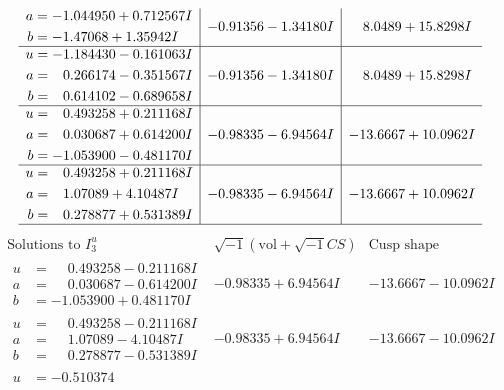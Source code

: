 \documentclass[1p]{elsarticle_modified}
\theoremstyle{definition}
\newcommand{\I}{\sqrt{-1}}
\begin{document}
$$\begin{array}{c|c|c}
\begin{aligned}
a &= -1.044950 + 0.712567 I \\
b &= -1.47068 + 1.35942 I\end{aligned}
 & -0.91356 - 1.34180 I & \phantom{-}8.0489 + 15.8298 I \\ \hline\begin{aligned}
u &= -1.184430 - 0.161063 I \\
a &= \phantom{-}0.266174 - 0.351567 I \\
b &= \phantom{-}0.614102 - 0.689658 I\end{aligned}
 & -0.91356 - 1.34180 I & \phantom{-}8.0489 + 15.8298 I \\ \hline\begin{aligned}
u &= \phantom{-}0.493258 + 0.211168 I \\
a &= \phantom{-}0.030687 + 0.614200 I \\
b &= -1.053900 - 0.481170 I\end{aligned}
 & -0.98335 - 6.94564 I & -13.6667 + 10.0962 I \\ \hline\begin{aligned}
u &= \phantom{-}0.493258 + 0.211168 I \\
a &= \phantom{-}1.07089 + 4.10487 I \\
b &= \phantom{-}0.278877 + 0.531389 I\end{aligned}
 & -0.98335 - 6.94564 I & -13.6667 + 10.0962 I\\
 \hline 
 \end{array}$$\newpage$$\begin{array}{c|c|c}  
\text{Solutions to }I^u_{3}& \I (\text{vol} + \sqrt{-1}CS) & \text{Cusp shape}\\
 \hline 
\begin{aligned}
u &= \phantom{-}0.493258 - 0.211168 I \\
a &= \phantom{-}0.030687 - 0.614200 I \\
b &= -1.053900 + 0.481170 I\end{aligned}
 & -0.98335 + 6.94564 I & -13.6667 - 10.0962 I \\ \hline\begin{aligned}
u &= \phantom{-}0.493258 - 0.211168 I \\
a &= \phantom{-}1.07089 - 4.10487 I \\
b &= \phantom{-}0.278877 - 0.531389 I\end{aligned}
 & -0.98335 + 6.94564 I & -13.6667 - 10.0962 I \\ \hline\begin{aligned}
u &= -0.510374\phantom{ +0.000000I} \\

\end{aligned}
\end{array}$$
\end{document}
